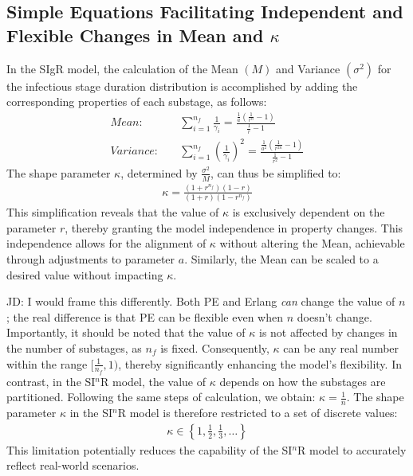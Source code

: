 \documentclass[12pt]{article}
\begin{document}
\subsection{Simple Equations Facilitating Independent and Flexible Changes in Mean and $\kappa$}
In the SIgR model, the calculation of the Mean $(M)$ and Variance $(\sigma^2)$ for the infectious stage duration distribution is accomplished by adding the corresponding properties of each substage, as follows:
\begin{align}
    Mean: \quad  &\sum_{i=1}^{n_f} \frac{1}{\gamma_i} = \frac{\frac{1}{a} (\frac{1}{r^n} - 1)}{\frac{1}{r} -1} \\
    Variance: \quad &\sum_{i=1}^{n_f} \left(\frac{1}{\gamma_i} \right)^2 = \frac{\frac{1}{a^2} (\frac{1}{r^{2n}} - 1)}{\frac{1}{r^2} -1}
\end{align}
The shape parameter $\kappa$, determined by $\frac{\sigma^2}{M}$, can thus be simplified to:
\begin{align}
    \kappa = \frac{(1+r^{n_f}) (1-r)}{(1+r) (1-r^{n_f})}
\end{align}
This simplification reveals that the value of $\kappa$ is exclusively dependent on the parameter $r$, thereby granting the model independence in property changes. This independence allows for the alignment of $\kappa$ without altering the Mean, achievable through adjustments to parameter $a$. Similarly, the Mean can be scaled to a desired value without impacting $\kappa$.

JD: I would frame this differently. Both PE and Erlang \emph{can} change the value of $n$; the real difference is that PE can be flexible even when $n$ doesn't change.
Importantly, it should be noted that the value of $\kappa$ is not affected by changes in the number of substages, as $n_f$ is fixed. Consequently, $\kappa$ can be any real number within the range $[\frac{1}{n_f}, 1)$, thereby significantly enhancing the model's flexibility. In contrast, in the SI$^n$R model, the value of $\kappa$ depends on how the substages are partitioned. Following the same steps of calculation, we obtain: $\kappa = \frac{1}{n}$. The shape parameter $\kappa$ in the SI$^n$R model is therefore restricted to a set of discrete values:
\begin{align*}
    \kappa \in \left\{1, \frac{1}{2}, \frac{1}{3}, \dots \right\}
\end{align*}
This limitation potentially reduces the capability of the SI$^n$R model to accurately reflect real-world scenarios.
\end{document}
